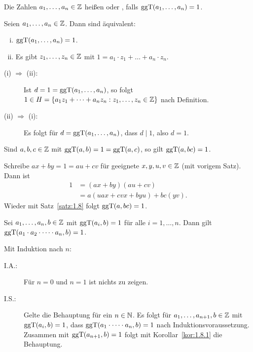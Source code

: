 	\begin{definition}
		Die Zahlen $a_1,\dots,a_n \in \mathbb{Z}$ heißen  oder , falls $\operatorname{ggT}(a_1,\dots,a_n) = 1$. \marginnote{[8]}
	\end{definition}

	\begin{satz}
		\label{satz:1.8}
		Seien $a_1,\dots,a_n \in \mathbb{Z}$.
		Dann sind äquivalent:
		\begin{enumerate}[(i)]
			\item $\operatorname{ggT}(a_1,\dots,a_n) = 1$.
			\item Es gibt $z_1,\dots,z_n \in \mathbb{Z}$ mit $1 = a_1\cdot z_1 + \dots + a_n \cdot z_n$.
		\end{enumerate}
	\end{satz}

	\begin{beweis}
		\begin{description}
			\item[(i) $\Rightarrow$ (ii):] Ist $d = 1 = \operatorname{ggT}(a_1,\dots,a_n)$, so folgt $1 \in H = \{a_1z_1 + \dots + a_nz_n : z_1,\dots,z_n \in \mathbb{Z}\}$ nach Definition.
			\item[(ii) $\Rightarrow$ (i):] Es folgt für $d = \operatorname{ggT}(a_1,\dots,a_n)$, dass $d \mid 1$, also $d = 1$. 
		\end{description}
	\end{beweis}

	\begin{korollar}
		\label{kor:1.8.1}
		Sind $a,b,c \in \mathbb{Z}$ mit $\operatorname{ggT}(a,b) = 1 = \operatorname{ggT}(a,c)$, so gilt $\operatorname{ggT}(a,bc) = 1$.
	\end{korollar}

	\begin{beweis}
		Schreibe $ax + by = 1 = au + cv$ für geeignete $x,y,u,v \in \mathbb{Z}$ (mit vorigem Satz).
		Dann ist
		\begin{align*}
			1 &= (ax + by)(au+cv) \\
			&= a (uax + cvx + byu) + bc(yv).
		\end{align*}
		Wieder mit Satz~\ref{satz:1.8} folgt $\operatorname{ggT}(a,bc) = 1$.
	\end{beweis}

	\begin{korollar}
		Sei $a_1,\dots,a_n,b \in \mathbb{Z}$ mit $\operatorname{ggT}(a_i,b) = 1$ für alle $i = 1,\dots,n$.
		Dann gilt $\operatorname{ggT}(a_1\cdot a_2 \cdot \dots \cdot a_n,b) = 1$.
	\end{korollar}

	\begin{beweis}
		Mit Induktion nach $n$:
		\begin{description}
			\item[I.A.:] Für $n = 0$ und $n=1$ ist nichts zu zeigen.
			\item[I.S.:] Gelte die Behauptung für ein $n \in \mathbb{N}$.
			Es folgt für $a_1,\dots,a_{n+1},b \in \mathbb{Z}$ mit $\operatorname{ggT}(a_i,b) = 1$, dass $\operatorname{ggT}(a_1 \cdot \dots \cdot a_n,b)=1$ nach Induktionsvoraussetzung.
			Zusammen mit $\operatorname{ggT}(a_{n+1},b) = 1$ folgt mit Korollar~\ref{kor:1.8.1} die Behauptung.
		\end{description}
	\end{beweis}

